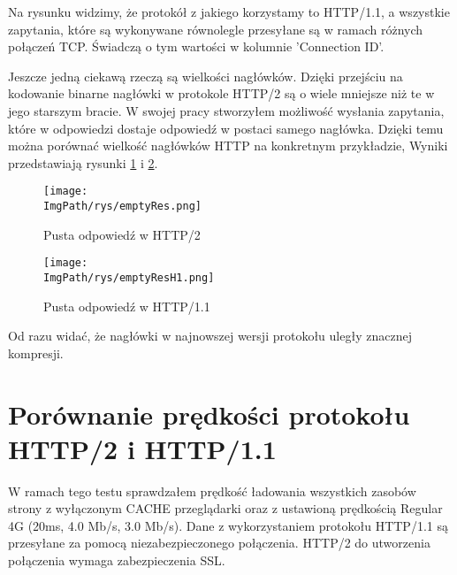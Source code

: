 \documentclass[a4paper,12pt,twoside,openany]{report}
\newcommand{\ImgPath}{.}
\begin{document}
Na rysunku widzimy, że protokół z jakiego korzystamy to HTTP/1.1, a wszystkie zapytania, które są wykonywane równolegle przesyłane są w ramach różnych połączeń TCP.
Świadczą o tym wartości w kolumnie 'Connection ID'.

Jeszcze jedną ciekawą rzeczą są wielkości nagłówków.
Dzięki przejściu na kodowanie binarne nagłówki w protokole HTTP/2 są o wiele mniejsze niż te w jego starszym bracie.
W swojej pracy stworzyłem możliwość wysłania zapytania, które w odpowiedzi dostaje odpowiedź w postaci samego nagłówka.
Dzięki temu można porównać wielkość nagłówków HTTP na konkretnym przykładzie,
Wyniki przedstawiają rysunki \ref{schematEmptyRes} i \ref{schematEmptyResH1}.

\begin{figure}[!htbp]
	\begin{center}
\centering
\texttt{[image: \\ImgPath/rys/emptyRes.png]}
\end{center}
	\caption{Pusta odpowiedź w HTTP/2}
	\label{schematEmptyRes}
\end{figure}

\begin{figure}[!htbp]
	\begin{center}
\centering
\texttt{[image: \\ImgPath/rys/emptyResH1.png]}
\end{center}
	\caption{Pusta odpowiedź w HTTP/1.1}
	\label{schematEmptyResH1}
\end{figure}

Od razu widać, że nagłówki w najnowszej wersji protokołu uległy znacznej kompresji. 


\section{Porównanie prędkości protokołu HTTP/2 i HTTP/1.1}

W ramach tego testu sprawdzałem prędkość ładowania wszystkich zasobów strony z wyłączonym CACHE przeglądarki oraz z ustawioną prędkością Regular 4G (20ms, 4.0 Mb/s, 3.0 Mb/s).
Dane z wykorzystaniem protokołu HTTP/1.1 są przesyłane za pomocą niezabezpieczonego połączenia.
HTTP/2 do utworzenia połączenia wymaga zabezpieczenia SSL.
\end{document}
